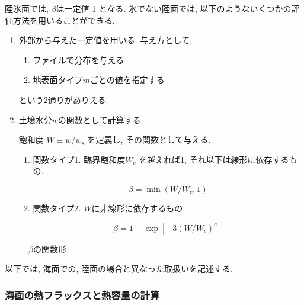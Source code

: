 陸氷面では, $\beta$は一定値 1 となる.
氷でない陸面では, 以下のようないくつかの評価方法を用いることができる.
\begin{enumerate}
\item 外部から与えた一定値を用いる. 与え方として,
      \begin{enumerate}
      \item ファイルで分布を与える
      \item 地表面タイプ$m$ごとの値を指定する
      \end{enumerate}
      という2通りがありえる.

\item 土壌水分$w$の関数として計算する.

       飽和度 $W \equiv w/w_s$ を定義し,
       その関数として与える.

      \begin{enumerate}
      \item 関数タイプ1.
            臨界飽和度$W_c$ を越えれば1, それ以下は線形に依存するもの.

        \begin{equation}
          \beta = \min \left( W/W_c, 1 \right)
        \end{equation}

      \item 関数タイプ2. $W$に非線形に依存するもの.

        \begin{equation}
          \beta = 1-\exp \left[-3(W/W_c)^{a} \right]
        \end{equation}
      \end{enumerate}

\end{enumerate}

  \begin{figure}[htbp]
    \begin{center}
      \leavevmode
      \caption{$\beta$の関数形}
    \end{center}
  \end{figure}


\bigskip
以下では, 海面での, 陸面の場合と異なった取扱いを記述する.
\bigskip

\subsubsection{海面の熱フラックスと熱容量の計算 }

